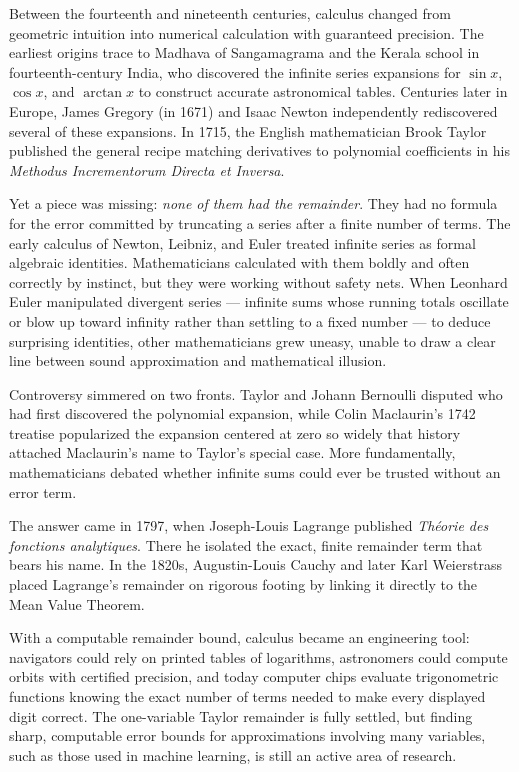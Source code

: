 \begin{historybox}
Between the fourteenth and nineteenth centuries, calculus changed from geometric
intuition into numerical calculation with guaranteed precision.
The earliest origins trace to Madhava of Sangamagrama and the Kerala school in fourteenth-century
India, who discovered the infinite series expansions for $\sin x$, $\cos x$, and $\arctan x$
to construct accurate astronomical tables. Centuries later in Europe, James Gregory (in 1671)
and Isaac Newton independently rediscovered several of these expansions. In 1715, the English
mathematician Brook Taylor published the general recipe matching derivatives to polynomial
coefficients in his \emph{Methodus Incrementorum Directa et Inversa}.

Yet a piece was missing: \emph{none of them had the remainder}.
They had no formula for the error committed by truncating a series after a finite number of terms.
The early calculus of Newton, Leibniz, and Euler treated infinite series as formal algebraic
identities. Mathematicians calculated with them boldly and often correctly by instinct, but they
were working without safety nets. When Leonhard Euler manipulated divergent series --- infinite
sums whose running totals oscillate or blow up toward infinity rather than settling to a fixed
number --- to deduce surprising identities, other mathematicians grew uneasy,
unable to draw a clear line between sound approximation and mathematical illusion.

Controversy simmered on two fronts. Taylor and Johann Bernoulli disputed who had first
discovered the polynomial expansion, while Colin Maclaurin's 1742 treatise
popularized the expansion centered at zero so widely that history attached Maclaurin's name
to Taylor's special case. More fundamentally, mathematicians debated whether infinite sums could
ever be trusted without an error term.

The answer came in 1797, when Joseph-Louis Lagrange published \emph{Th{\'e}orie des
fonctions analytiques}. There he isolated the exact, finite remainder
term that bears his name. In the 1820s, Augustin-Louis Cauchy and later Karl Weierstrass placed
Lagrange's remainder on rigorous footing by linking it directly to the Mean Value Theorem.

With a computable remainder bound, calculus became an engineering tool:
navigators could rely on printed tables of logarithms,
astronomers could compute orbits with certified precision, and today computer chips
evaluate trigonometric functions knowing the exact number of terms needed to make every displayed
digit correct. The one-variable Taylor remainder is fully settled, but finding sharp,
computable error bounds for approximations involving many variables, such as those used in
machine learning, is still an active area of research.
\end{historybox}

